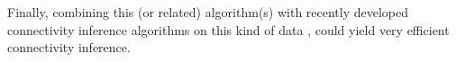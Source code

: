 

Finally, combining this (or related) algorithm(s) with recently developed connectivity inference algorithms on this kind of data \cite{MishchenkoPaninski09}, could yield very efficient connectivity inference.


























